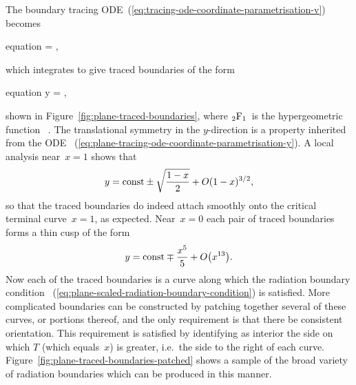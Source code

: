 The boundary tracing ODE~(\ref{eq:tracing-ode-coordinate-parametrisation-v})
becomes
\begin{important}{equation}
   = \mp {},
  \label{eq:plane-tracing-ode-coordinate-parametrisation-y}
\end{important}
which integrates to give traced boundaries of the form
\begin{important}{equation}
  y =
  \const
    \mp
  \hypergeo {},
  \label{eq:plane-traced-boundary}
\end{important}
shown in Figure~\ref{fig:plane-traced-boundaries},
where $\mathop{}\!{_2\mathrm{F}_1}$~is the hypergeometric function~%
\cite[Chapter~15]{olver-2010-nist-handbook-mathematical-functions}.
The translational symmetry in the $y$-direction
is a property inherited from the ODE~%
  (\ref{eq:plane-tracing-ode-coordinate-parametrisation-y}).
A local analysis near~$x = 1$ shows that
\begin{equation}
  y = \mathrm{const} \pm \sqrt{\frac{1 - x}{2}} + \mathop{}\! O (1 - x)^{3/2},
  \label{eq:plane-traced-boundary-x-near-1}
\end{equation}
so that the traced boundaries do indeed attach smoothly
onto the critical terminal curve~$x = 1$, as expected.
Near~$x = 0$ each pair of traced boundaries forms a thin cusp of the form
\begin{equation}
  y = \const \mp \frac{x^5}{5} + \order \roundbr*{x^{13}}.
  \label{eq:plane-traced-boundary-x-near-0}
\end{equation}
Now each of the traced boundaries is a curve along which
the radiation boundary condition~%
  (\ref{eq:plane-scaled-radiation-boundary-condition})
is satisfied.
More complicated boundaries can be constructed
by patching together several of these curves, or portions thereof,
and the only requirement is that there be consistent orientation.
This requirement is satisfied by identifying as interior
the side on which $T$ (which equals~$x$) is greater,
i.e.~the side to the right of each curve.
Figure~\ref{fig:plane-traced-boundaries-patched} shows
a sample of the broad variety of radiation boundaries
which can be produced in this manner.

\begin{figure}
\end{figure}

